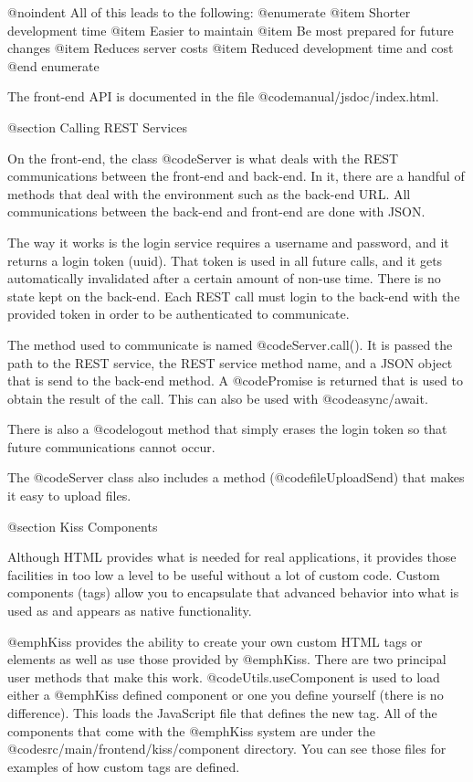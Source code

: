 @noindent
All of this leads to the following:
@enumerate
@item
Shorter development time
@item 
Easier to maintain
@item
Be most prepared for future changes
@item
Reduces server costs
@item
Reduced development time and cost
@end enumerate

The front-end API is documented in the file @code{manual/jsdoc/index.html}.



@section Calling REST Services

On the front-end, the class @code{Server} is what deals with the REST
communications between the front-end and back-end.  In it, there are a
handful of methods that deal with the environment such as the back-end
URL.  All communications between the back-end and front-end are done
with JSON.

The way it works is the login service requires a username and
password, and it returns a login token (uuid).  That token is used in
all future calls, and it gets automatically invalidated after a certain
amount of non-use time.  There is no state kept on the back-end.  Each
REST call must login to the back-end with the provided token in order
to be authenticated to communicate.

The method used to communicate is named @code{Server.call()}. It is passed the
path to the REST service, the REST service method name, and a JSON
object that is send to the back-end method.  A @code{Promise} is
returned that is used to obtain the result of the call.  This
can also be used with @code{async/await}.

There is also a @code{logout} method that simply erases the
login token so that future communications cannot occur.

The @code{Server} class also includes a method (@code{fileUploadSend})
that makes it easy to upload files.

@section Kiss Components


Although HTML provides what is needed for real applications, it
provides those facilities in too low a level to be useful without a
lot of custom code.  Custom components (tags) allow you to encapsulate
that advanced behavior into what is used as and appears as native
functionality.

@emph{Kiss} provides the ability to create your own custom HTML tags
or elements as well as use those provided by @emph{Kiss}.  There are
two principal user methods that make this work.
@code{Utils.useComponent} is used to load either a @emph{Kiss} defined
component or one you define yourself (there is no difference).  This
loads the JavaScript file that defines the new tag.  All of the
components that come with the @emph{Kiss} system are under the
@code{src/main/frontend/kiss/component} directory.  You can see those
files for examples of how custom tags are defined.

